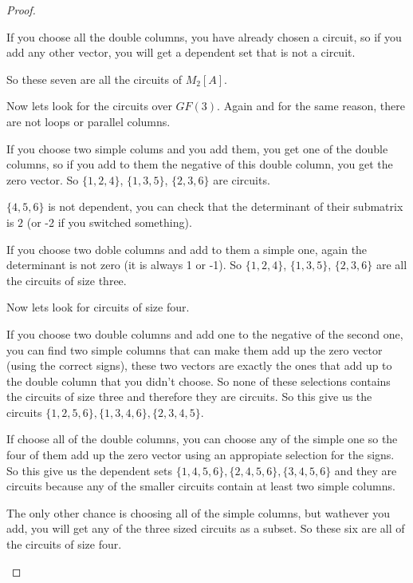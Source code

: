 \begin{proof}
\begin{enumerate}
            If you choose all the double columns, you have already chosen a circuit, so if you add any other vector,
            you will get a dependent set that is not a circuit.\pn
            
            So these seven are all the circuits of $M_2[A]$.\pn
            
            Now lets look for the circuits over $GF(3)$. Again and for the same reason, there are not loops or parallel columns.\pn
            
            If you choose two simple colums and you add them, you get one of the double columns, so if you add to them the
            negative of this double column, you get the zero vector. So $\{1, 2, 4\}$, $\{1, 3, 5\}$, $\{2, 3, 6\}$ are
            circuits.\pn
            
            $\{4, 5, 6\}$ is not dependent, you can check that the determinant of their submatrix is $2$ (or -2 if you switched
            something).\pn
            
            If you choose two doble columns and add to them a simple one, again the determinant is not zero (it is always 1 or -1).
            So $\{1, 2, 4\}$, $\{1, 3, 5\}$, $\{2, 3, 6\}$ are all the circuits of size three.\pn
            
            Now lets look for circuits of size four.\pn
            
            If you choose two double columns and add one to the negative of the second one, you can find two simple columns that 
            can make them add up the zero vector (using the correct signs), these two vectors are exactly the ones that add up to
            the double column that you didn't choose. So none of these selections contains the circuits of size three and therefore
            they are circuits. So this give us the circuits $\{1, 2, 5, 6\}, \{1, 3, 4, 6\}, \{2, 3, 4, 5\}$.\pn
            
            If choose all of the double columns, you can choose any of the simple one so the four of them add up the zero vector using
            an appropiate selection for the signs. So this give us the dependent sets $\{1, 4, 5, 6\}, \{2, 4, 5, 6\}, \{3, 4, 5, 6\}$ 
            and they are circuits because any of the smaller circuits contain at least two simple columns.\pn
            
            The only other chance is choosing all of the simple columns, but wathever you add, you will get any of the three sized
            circuits as a subset. So these six are all of the circuits of size four.\pn
            

\end{enumerate}
\end{proof}

